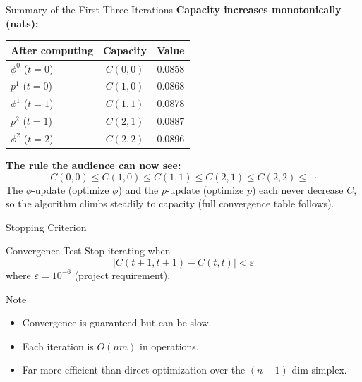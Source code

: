 \documentclass{beamer}
\begin{document}
\begin{frame}{Summary of the First Three Iterations}
    \footnotesize
    \textbf{Capacity increases monotonically (nats):}
    \begin{center}
        \begin{tabular}{lcc}
            \toprule
            After computing & Capacity & Value \\
            \midrule
            $\phi^0$ ($t=0$) & $C(0,0)$ & 0.0858 \\
            $p^1$   ($t=0$) & $C(1,0)$ & 0.0868 \\
            $\phi^1$ ($t=1$) & $C(1,1)$ & 0.0878 \\
            $p^2$   ($t=1$) & $C(2,1)$ & 0.0887 \\
            $\phi^2$ ($t=2$) & $C(2,2)$ & 0.0896 \\
            \bottomrule
        \end{tabular}
    \end{center}
    \medskip

    \textbf{The rule the audience can now see:}
    $$
    C(0,0)\le C(1,0)\le C(1,1)\le C(2,1)\le C(2,2)\le\cdots
    $$
    The $\phi$-update (optimize $\phi$) and the $p$-update (optimize $p$) each never decrease $C$, so the algorithm climbs steadily to capacity (full convergence table follows).
\end{frame}

\begin{frame}{Stopping Criterion}
    \begin{block}{Convergence Test}
        Stop iterating when
        $$
            \bigl| C(t+1, t+1) - C(t, t) \bigr| < \varepsilon
        $$
        where $\varepsilon = 10^{-6}$ (project requirement).
    \end{block}

    \begin{alertblock}{Note}
        \begin{itemize}
            \item Convergence is guaranteed but can be slow.
            \item Each iteration is $O(nm)$ in operations.
            \item Far more efficient than direct optimization over the $(n-1)$-dim simplex.
        \end{itemize}
    \end{alertblock}
\end{frame}
\end{document}
